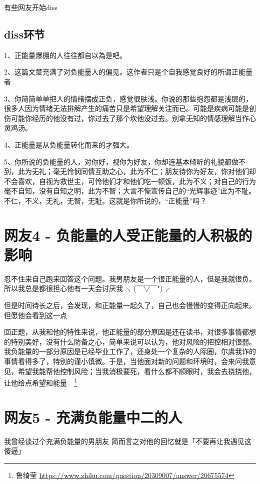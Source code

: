 有些网友开始diss

\subsection{diss环节}

1、正能量爆棚的人往往都自以為是吧。

2、这篇文章充满了对负能量人的偏见。这作者只是个自我感觉良好的所谓正能量者

3、你简简单单把人的情绪摆成正负，感觉很肤浅。你说的那些抱怨都是浅层的，很多人因为情绪无法排解产生的痛苦只是希望理解关注而已。可能是疾病可能是创伤可能你经历的他没有过，你过去了那个坎他没过去。别拿无知的情感理解当作心灵鸡汤。

4、正能量是从负能量转化而来的才强大。

5、你所说的负能量的人，对你好，视你为好友，你却连基本倾听的礼貌都做不到，此为无礼；毫无怜悯同情互助之心，此为不仁；朋友待你为好友，你对他们却不会喜欢，自视为救世主，可怜他们才和他们吃一顿饭，此为不义；对自己的行为毫不自知，没有自知之明，此为不智；大言不惭宣传自己的“光辉事迹”此为不耻。不仁，不义，无礼，无智，无耻。这就是你所说的，“正能量”吗？

\section{网友4 - 负能量的人受正能量的人积极的影响}

忍不住来自己跑来回答这个问题。我男朋友是一个很正能量的人，但是我就很负。所以我总是都很担心他有一天会讨厌我~╮(￣▽￣")╭

但是时间待长之后，会发现，和正能量一起久了，自己也会慢慢的变得正向起来。但愿他会看到这一点~~~

回正题，从我和他的特性来说，他正能量的部分原因是还在读书，对很多事情都想的特别美好，没有什么防备之心，简单来说可以认为，他对风险的把控相对很弱。我负能量的一部分原因是已经毕业工作了，还身处一个复杂的人际圈，尔虞我诈的事情看得多了，特别的谨小慎微。于是，当他面对新的问题和环境时，会来问我意见，希望我能帮他控制风险；当我消极要死，看什么都不顺眼时，我会去挠挠他，让他给点希望和能量~~\footnote{鲁绮莹 \quad \url{https://www.zhihu.com/question/20309007/answer/20675574}}

\section{网友5 - 充满负能量中二的人}

我曾经谈过个充满负能量的男朋友 简而言之对他的回忆就是「不要再让我遇见这傻逼」

